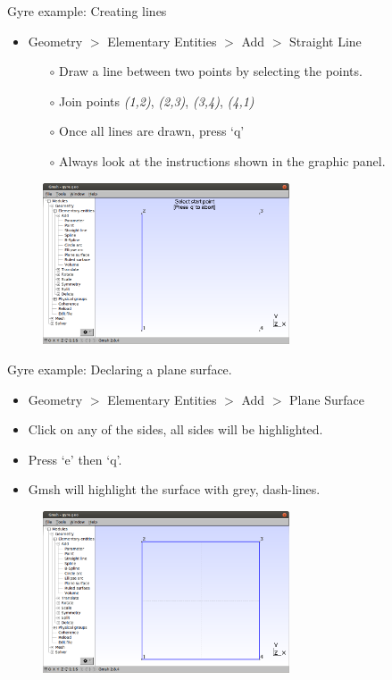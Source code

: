 \documentclass[t]{beamer}
\begin{document}
\begin{frame}{Gyre example: Creating lines}
\begin{itemize}
\item Geometry $>$ Elementary Entities $>$ Add $>$ Straight Line
\begin{itemize}
\item[$\circ$] Draw a line between two points by selecting the points.
\item[$\circ$] Join points \emph{(1,2)}, \emph{(2,3)}, \emph{(3,4)}, \emph{(4,1)}
\item[$\circ$] Once all lines are drawn, press `q'
\item[$\circ$] Always look at the instructions shown in the graphic panel.
\end{itemize}
\end{itemize}
\begin{figure}[htbp]
 \centering
  \includegraphics[width=0.65\textwidth]{../figures/Gmsh_drawing_lines.png}
\end{figure}
\end{frame}

\begin{frame}{Gyre example: Declaring a plane surface.}
\begin{itemize}
\item Geometry $>$ Elementary Entities $>$ Add $>$ Plane Surface
\item Click on any of the sides, all sides will be highlighted.
\item Press `e' then `q'.
\item Gmsh will highlight the surface with grey, dash-lines.
\end{itemize}
\begin{figure}[htbp]
 \centering
  \includegraphics[width=0.65\textwidth]{../figures/2d-example-surface}
\end{figure}
\end{frame}
\end{document}

